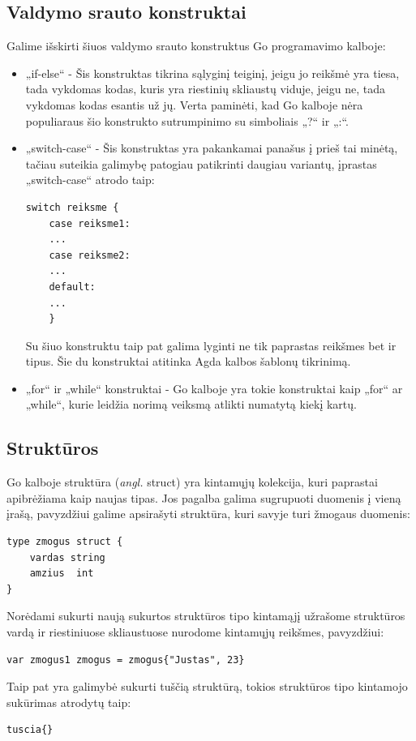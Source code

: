 \documentclass{VUMIFPSbakalaurinis}
\begin{document}
\subsection{Valdymo srauto konstruktai}
Galime išskirti šiuos valdymo srauto konstruktus Go programavimo kalboje:
\begin{itemize}
	\item „if-else“ - Šis konstruktas tikrina sąlyginį teiginį, jeigu jo reikšmė yra tiesa, tada vykdomas kodas, kuris yra riestinių skliaustų viduje, jeigu ne, tada vykdomas kodas esantis už jų. Verta paminėti, kad Go kalboje nėra populiaraus šio konstrukto sutrumpinimo su simboliais „?“ ir „:“.
	\item {„switch-case“ - Šis konstruktas yra pakankamai panašus į prieš tai minėtą, tačiau suteikia galimybę patogiau patikrinti daugiau variantų, įprastas „switch-case“ atrodo taip:
	\begin{lstlisting}[language=GoCust]
switch reiksme {
	case reiksme1:
	...
	case reiksme2:
	...
	default:
	...
	}
	\end{lstlisting}
	Su šiuo konstruktu taip pat galima lyginti ne tik paprastas reikšmes bet ir tipus. Šie du konstruktai atitinka Agda kalbos šablonų tikrinimą.
	}
	\item „for“ ir „while“ konstruktai - Go kalboje yra tokie konstruktai kaip „for“ ar „while“, kurie leidžia norimą veiksmą atlikti numatytą kiekį kartų.
\end{itemize}
\subsection{Struktūros}
Go kalboje struktūra (\textit{angl.} struct) yra kintamųjų kolekcija, kuri paprastai apibrėžiama kaip naujas tipas. Jos pagalba galima sugrupuoti duomenis į vieną įrašą, pavyzdžiui galime apsirašyti struktūra, kuri savyje turi žmogaus duomenis:
\begin{lstlisting}[language=GoCust]
type zmogus struct {
	vardas string
	amzius  int
}
\end{lstlisting}
Norėdami sukurti naują sukurtos struktūros tipo kintamąjį užrašome struktūros vardą ir riestiniuose skliaustuose nurodome kintamųjų reikšmes, pavyzdžiui: 
\begin{lstlisting}[language=GoCust]
var zmogus1 zmogus = zmogus{"Justas", 23}
\end{lstlisting}
Taip pat yra galimybė sukurti tuščią struktūrą, tokios struktūros tipo kintamojo sukūrimas atrodytų taip: 
\begin{lstlisting}
tuscia{}
\end{lstlisting}
\end{document}
